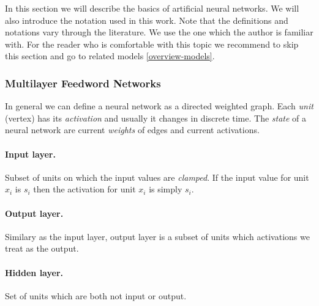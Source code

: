 
\newcommand{\argmin}{\operatornamewithlimits{arg\,min}}
\newcommand{\Bx}{{\bf x}}
\newcommand{\By}{{\bf y}}
\newcommand{\Bh}{{\bf h}}
\newcommand{\Bw}{{\bf w}}
\newcommand{\Bc}{{\bf c}}

In this section we will describe the basics of artificial neural networks. We will also introduce the notation used in this work. Note that the definitions and notations vary through the literature. We use the one which the author is familiar with. For the reader who is comfortable with this topic we recommend to skip this section and go to related models \ref{overview-models}. 

 
\label{sec:perceptron} 

\subsubsection{Multilayer Feedword Networks} 

In general we can define a neural network as a directed weighted graph. Each \emph{unit} (vertex) has its \emph{activation} and usually it changes in discrete time. The \emph{state} of a neural network are current \emph{weights} of edges and current activations. 

\paragraph{Input layer.}
Subset of units on which the input values are \emph{clamped}. If the input value for unit $x_i$ is $s_i$ then the activation for unit $x_i$ is simply $s_i$. 

\paragraph{Output layer.}
Similary as the input layer, output layer is a subset of units which activations we treat as the output. 

\paragraph{Hidden layer.}
Set of units which are both not input or output. 
